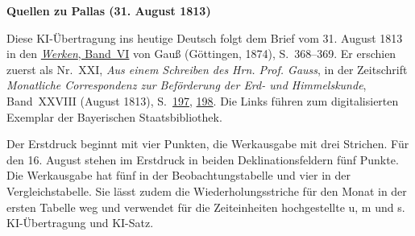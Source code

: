\clearpage\thispagestyle{empty}
\begin{center}\textbf{Quellen zu Pallas (31. August 1813)}\end{center}
\noindent Diese KI-Übertragung ins heutige Deutsch folgt dem Brief vom 31. August 1813 in den \href{https://gdz.sub.uni-goettingen.de/id/PPN236007467}{\textit{Werken}, Band~VI} von Gauß (Göttingen, 1874), S.~368--369. Er erschien zuerst als Nr.~XXI, \textit{Aus einem Schreiben des Hrn. Prof. Gauss}, in der Zeitschrift \textit{Monatliche Correspondenz zur Beförderung der Erd- und Himmelskunde}, Band~XXVIII (August 1813), S.~\href{https://api.digitale-sammlungen.de/iiif/image/v2/bsb10538617_00205/full/1600,/0/default.jpg}{197}, \href{https://api.digitale-sammlungen.de/iiif/image/v2/bsb10538617_00206/full/1600,/0/default.jpg}{198}. Die Links führen zum digitalisierten Exemplar der Bayerischen Staatsbibliothek.
\par\smallskip\noindent Der Erstdruck beginnt mit vier Punkten, die Werkausgabe mit drei Strichen. Für den 16. August stehen im Erstdruck in beiden Deklinationsfeldern fünf Punkte. Die Werkausgabe hat fünf in der Beobachtungstabelle und vier in der Vergleichstabelle. Sie lässt zudem die Wiederholungsstriche für den Monat in der ersten Tabelle weg und verwendet für die Zeiteinheiten hochgestellte u, m und s. KI-Übertragung und KI-Satz.
\clearpage
